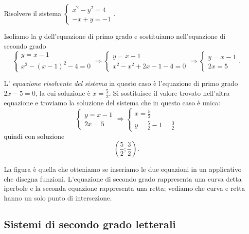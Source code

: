 \begin{esempio}{}{}
Risolvere il sistema 
\(\left\{\begin{array}{l}x^2-y^2=4\\-x+y=-1\end{array}\right.\).

Isoliamo la \(y\) dell'equazione di primo grado e sostituiamo nell'equazione di 
secondo grado 
\[\left\{\begin{array}{l}y=x-1 \\
x^2-(x-1)^2-4=0\end{array}\right.
\Rightarrow \left\{\begin{array}{l}y=x-1 \\
x^2-x^2+2x-1-4=0\end{array}\right.
\Rightarrow \left\{\begin{array}{l}y=x-1\\2x=5\end{array}\right..\]

L' \emph{equazione risolvente del sistema} in questo caso è l'equazione di primo 
grado \(2x-5=0\), la cui soluzione è \(x=\frac 5 2\). Si sostituisce il valore 
trovato nell'altra equazione e troviamo la soluzione del sistema che in questo 
caso è unica: 
\[\left\{\begin{array}{l}y=x-1 \\2x=5\end{array}\right. 
\Rightarrow\left\{\begin{array}{l}x=\frac 5 2 \\
y=\frac 5 2-1=\frac 3 2\end{array}\right.\] 
quindi con soluzione \[\left(\frac 5 2;\frac 3 2\right).\]

\begin{htmulticols}{2}
La figura è quella che otteniamo se inseriamo le due equazioni in un applicativo 
che disegna funzioni. L'equazione di secondo grado rappresenta una curva detta 
iperbole e la seconda equazione rappresenta una retta; vediamo che curva e retta 
hanno un solo punto di intersezione.
\begin{center}

\end{center}
\end{htmulticols}
\end{esempio}


\subsection{Sistemi di secondo grado letterali}

